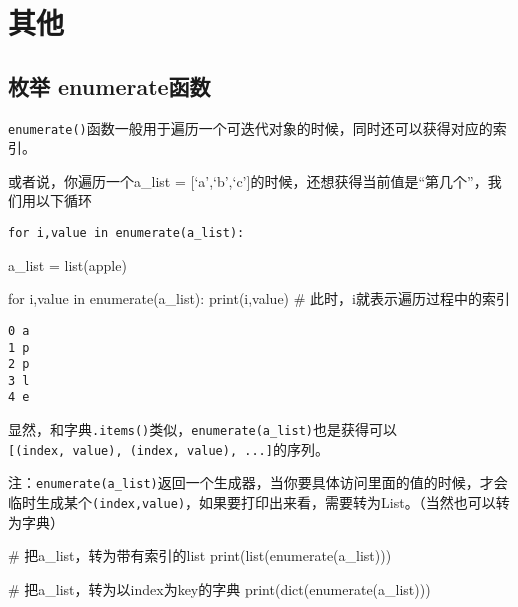 \documentclass[
  letterpaper,
  DIV=11,
  numbers=noendperiod]{scrreprt}
\newenvironment{Shaded}{\begin{snugshade}}{\end{snugshade}}
\newcommand{\BuiltInTok}[1]{\textcolor[rgb]{0.00,0.23,0.31}{#1}}
\newcommand{\CommentTok}[1]{\textcolor[rgb]{0.37,0.37,0.37}{#1}}
\newcommand{\ControlFlowTok}[1]{\textcolor[rgb]{0.00,0.23,0.31}{#1}}
\newcommand{\KeywordTok}[1]{\textcolor[rgb]{0.00,0.23,0.31}{#1}}
\newcommand{\NormalTok}[1]{\textcolor[rgb]{0.00,0.23,0.31}{#1}}
\newcommand{\OperatorTok}[1]{\textcolor[rgb]{0.37,0.37,0.37}{#1}}
\newcommand{\StringTok}[1]{\textcolor[rgb]{0.13,0.47,0.30}{#1}}
\begin{document}
\hypertarget{ux5176ux4ed6-1}{%
\section{其他}\label{ux5176ux4ed6-1}}

\hypertarget{ux679aux4e3e-enumerateux51fdux6570}{%
\subsection{枚举
enumerate函数}\label{ux679aux4e3e-enumerateux51fdux6570}}

\texttt{enumerate()}函数一般用于遍历一个可迭代对象的时候，同时还可以获得对应的索引。

或者说，你遍历一个a\_list =
{[}`a',`b',`c'{]}的时候，还想获得当前值是``第几个''，我们用以下循环

\texttt{for\ i,value\ in\ enumerate(a\_list):}

\begin{Shaded}
\begin{Highlighting}[]
\NormalTok{a\_list }\OperatorTok{=} \BuiltInTok{list}\NormalTok{(}\StringTok{\textquotesingle{}apple\textquotesingle{}}\NormalTok{)}

\ControlFlowTok{for}\NormalTok{ i,value }\KeywordTok{in} \BuiltInTok{enumerate}\NormalTok{(a\_list):}
    \BuiltInTok{print}\NormalTok{(i,value) }\CommentTok{\# 此时，i就表示遍历过程中的索引}
\end{Highlighting}
\end{Shaded}

\begin{verbatim}
0 a
1 p
2 p
3 l
4 e
\end{verbatim}

显然，和字典\texttt{.items()}类似，\texttt{enumerate(a\_list)}也是获得可以
\texttt{{[}(index,\ value),\ (index,\ value),\ ...{]}}的序列。

注：\texttt{enumerate(a\_list)}返回一个生成器，当你要具体访问里面的值的时候，才会临时生成某个\texttt{(index,value)}，如果要打印出来看，需要转为List。（当然也可以转为字典）

\begin{Shaded}
\begin{Highlighting}[]
\CommentTok{\# 把a\_list，转为带有索引的list}
\BuiltInTok{print}\NormalTok{(}\BuiltInTok{list}\NormalTok{(}\BuiltInTok{enumerate}\NormalTok{(a\_list)))}

\CommentTok{\# 把a\_list，转为以index为key的字典}
\BuiltInTok{print}\NormalTok{(}\BuiltInTok{dict}\NormalTok{(}\BuiltInTok{enumerate}\NormalTok{(a\_list)))}
\end{Highlighting}
\end{Shaded}
\end{document}
